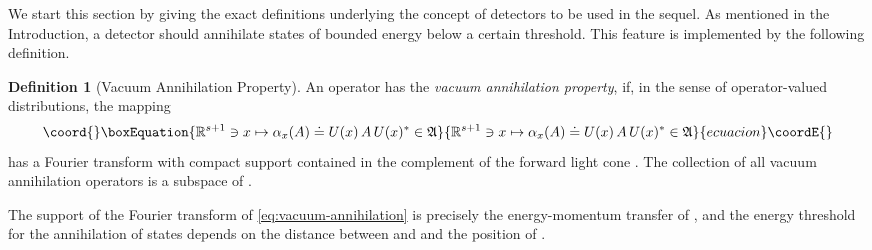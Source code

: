 \documentclass[a4paper,a4paper]{article}
\numberwithin{equation}{section}
\providecommand{\Afrak}{\mathfrak{A}}
\providecommand{\Rsone}{\mathbb{R}^{s + 1}}
\providecommand{\Aann}{\mathfrak{A}_{\text{\itshape ann}}}
\providecommand{\fwcone}{\overline{V}_{\negthinspace +}}
\providecommand{\ax}{\alpha_x}
\theoremstyle{definition}
\newtheorem{definition}{Definition}[section]
\theoremstyle{plain}
\theoremstyle{remark}
\begin{document}
  We start this section by giving the exact definitions underlying the
  concept of detectors to be used in the sequel. As mentioned in the
  Introduction, a detector should annihilate states of bounded energy
  below a certain threshold. This feature is implemented by the
  following definition.
  \begin{definition}[Vacuum Annihilation Property]
    \label{def:vacuum-annihilation}
    An operator \myHighlight{$A \in \Afrak$}\coordHE{} has the \emph{vacuum annihilation
    property}, if, in the sense of operator-valued distributions,
    the mapping
    \begin{equation}\coord{}\boxEquation{
      \label{eq:vacuum-annihilation}
      \Rsone \ni x \mapsto \ax ( A ) \doteq U ( x ) \, A \, U ( x )^*
      \in \Afrak
    }{
      \Rsone \ni x \mapsto \ax ( A ) \doteq U ( x ) \, A \, U ( x )^*
      \in \Afrak
    }{ecuacion}\coordE{}\end{equation}
    has a Fourier transform with compact support \myHighlight{$\Gamma$}\coordHE{} contained in
    the complement of the forward light cone \myHighlight{$\fwcone$}\coordHE{}. The collection
    of all vacuum annihilation operators is a subspace \myHighlight{$\Aann$}\coordHE{} of
    \myHighlight{$\Afrak$}\coordHE{}.
  \end{definition}
  The support of the Fourier transform of
  \eqref{eq:vacuum-annihilation} is precisely the energy-momen\-tum
  transfer of \coordHE{}, and the energy threshold for the annihilation of
  states depends on the distance \myHighlight{$d ( \Gamma , \fwcone )$}\coordHE{} between
  \myHighlight{$\Gamma$}\coordHE{} and \myHighlight{$\fwcone$}\coordHE{} and the position of \myHighlight{$\Gamma$}\coordHE{}.
  
\end{document}
